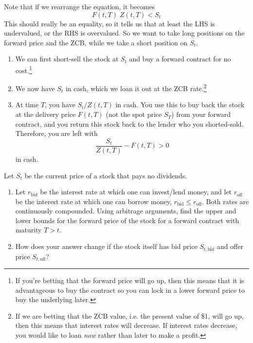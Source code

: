 \documentclass{article}
\begin{document}
    \begin{solution}
      Note that if we rearrange the equation, it becomes 
      \begin{equation}
        F(t, T) \; Z (t, T) < S_t
      \end{equation}
      This should really be an equality, so it tells us that at least the LHS is undervalued, or the RHS is overvalued. So we want to take long positions on the forward price and the ZCB, while we take a short position on $S_t$. 
      \begin{enumerate}
        \item We can first short-sell the stock at $S_t$ and buy a forward contract for no cost.\footnote{If you're betting that the forward price will go up, then this means that it is advantageous to buy the contract so you can lock in a lower forward price to buy the underlying later. }
        \item We now have $S_t$ in cash, which we loan it out at the ZCB rate.\footnote{If we are betting that the ZCB value, i.e. the present value of \$1, will go up, then this means that interest rates will decrease. If interest rates decrease, you would like to loan \textit{now} rather than later to make a profit. }

        \item At time $T$, you have $S_t / Z(t, T)$ in cash. You use this to buy back the stock at the delivery price $F(t, T)$ (not the spot price $S_T$) from your forward contract, and you return this stock back to the lender who you shorted-sold. Therefore, you are left with 
          \begin{equation}
            \frac{S_t}{Z(t, T)} - F(t, T) > 0 
          \end{equation}
          in cash. 
      \end{enumerate}
    \end{solution}
    
    \begin{exercise}
      Let $S_t$ be the current price of a stock that pays no dividends. 
      \begin{enumerate}
        \item Let $r_{\mathrm{bid}}$ be the interest rate at which one can invest/lend money, and let $r_{\mathrm{off}}$ be the interest rate at which one can borrow money, $r_{\mathrm{bid}} \leq r_{\mathrm{off}}$. Both rates are continuously compounded. Using arbitrage arguments, find the upper and lower bounds for the forward price of the stock for a forward contract with maturity $T > t$. 

        \item How does your answer change if the stock itself has bid price $S_{t, \mathrm{bid}}$ and offer price $S_{t, \mathrm{off}}$? 
      \end{enumerate}
    \end{exercise}
\end{document}

